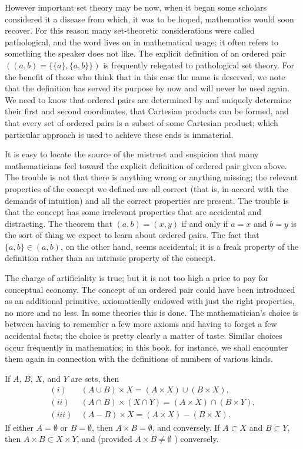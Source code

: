 However important set theory may be now, when it began some scholars considered it a disease from which, it was to be hoped, mathematics would soon recover. For this reason many set-theoretic considerations were called pathological, and the word lives on in mathematical usage; it often refers to something the speaker does not like. The explicit definition of an ordered pair $((a,b) = \{ \{ a \}, \{ a, b \} \})$ is frequently relegated to pathological set theory. For the benefit of those who think that in this case the name is deserved, we note that the definition has served its purpose by now and will never be used again. We need to know that ordered pairs are determined by and uniquely determine their first and second coordinates, that Cartesian products can be formed, and that every set of ordered pairs is a subset of some Cartesian product; which particular approach is used to achieve these ends is immaterial. 

It is easy to locate the source of the mistrust and suspicion that many mathematicians feel toward the explicit definition of ordered pair given above. The trouble is not that there is anything wrong or anything missing; the relevant properties of the concept we defined are all correct (that is, in accord with the demands of intuition) and all the correct properties are present. The trouble is that the concept has some irrelevant properties that are accidental and  distracting. The theorem that $(a, b) = (x, y)$ if and only if $a = x$ and $b = y$ is the sort of thing we expect to learn about ordered pairs. The fact that $\{ a, b \} \in (a,b) $, on the other hand, seems accidental; it is a freak property of the definition rather than an intrinsic property of the concept.

The charge of artificiality is true; but it is not too high a price to pay for conceptual economy. The concept of an ordered pair could have been introduced as an additional primitive, axiomatically endowed with just the right properties, no more and no less. In some theories this is done. The mathematician's choice is between having to remember a few more axioms and having to forget a few accidental facts; the choice is pretty clearly a matter of taste. Similar choices occur frequently in mathematics; in this book, for instance, we shall encounter them again in connection with the definitions of numbers of various kinds. 

\begin{exercise} If $A$, $B$, $X$, and $Y$ are sets, then 
\begin{align*} 
(i)& \: (A \cup B) \times X = ( A \times X ) \cup ( B \times X), \\
(ii)& \:  (A \cap B ) \times ( X \cap Y) = (A \times X) \cap ( B \times Y),\\
(iii)& \: (A - B ) \times X = (A \times X) - (B \times X).
\end{align*}
If either $A = \emptyset $ or $B = \emptyset $, then $ A \times B = \emptyset $, and conversely. If $ A \subset X $ and $B \subset Y$, then $A \times B \subset X \times Y$, and (provided $A \times B \neq \emptyset $ ) conversely. 
\end{exercise}